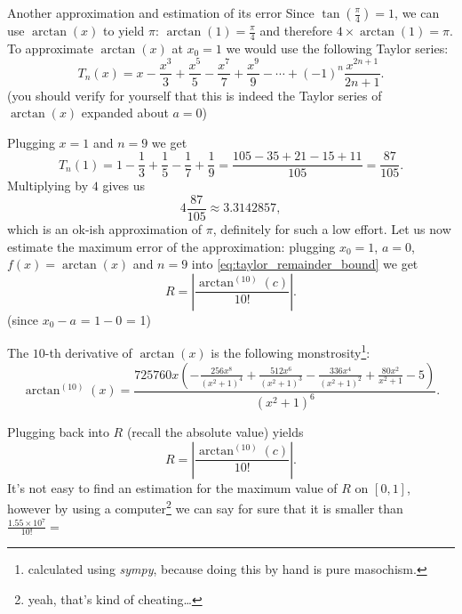\begin{example}{Another approximation and estimation of its error}{}
  Since $\tan\left(\frac{\pi}{4}\right)=1$, we can use $\arctan(x)$ to yield $\pi$: $\arctan(1)=\frac{\pi}{4}$ and therefore $4\times\arctan(1)=\pi$. To approximate $\arctan(x)$ at $x_{0}=1$ we would use the following Taylor series:
  \[
    T_{n}(x) = x - \frac{x^{3}}{3} + \frac{x^{5}}{5} - \frac{x^{7}}{7} + \frac{x^{9}}{9} - \cdots + (-1)^{n}\frac{x^{2n+1}}{2n+1}.
  \]
  (you should verify for yourself that this is indeed the Taylor series of $\arctan(x)$ expanded about $a=0$)

  Plugging $x=1$ and $n=9$ we get
  \[
    T_{n}\left(1\right) = 1 - \frac{1}{3} + \frac{1}{5} - \frac{1}{7} + \frac{1}{9} = \frac{105-35+21-15+11}{105} = \frac{87}{105}.
  \]
  Multiplying by $4$ gives us
  \[
    4\frac{87}{105} \approx 3.3142857,
  \]
  which is an ok-ish approximation of $\pi$, definitely for such a low effort. Let us now estimate the maximum error of the approximation: plugging $x_{0}=1$, $a=0$, $f(x)=\arctan(x)$ and $n=9$ into \autoref{eq:taylor_remainder_bound} we get
  \[
    R = \left| \frac{\arctan^{(10)}(c)}{10!} \right|.
  \]
  (since $x_{0}-a$ = $1-0$ = 1)

  The $10$-th derivative of $\arctan(x)$ is the following monstrosity\footnote{calculated using \textit{sympy}, because doing this by hand is pure masochism.}:
  \[
    \arctan^{(10)}(x) = \frac{725760 x \left(- \frac{256 x^{8}}{\left(x^{2} + 1\right)^{4}} + \frac{512 x^{6}}{\left(x^{ 2} + 1\right)^{3}} - \frac{336 x^{4}}{\left(x^{2} + 1\right)^{2}} + \frac{80 x^{2}}{x^{2} + 1} - 5\right)}{ \left(x^{2} + 1\right)^{6}}.
  \]

  Plugging back into $R$ (recall the absolute value) yields
  \[
    R = \left| \frac{\arctan^{(10)}(c)}{10!} \right|.
  \]
  It's not easy to find an estimation for the maximum value of $R$ on $[0,1]$, however by using a computer\footnote{yeah, that's kind of cheating\ldots} we can say for sure that it is smaller than $\frac{1.55\times10^{7}}{10!}=$
\end{example}



